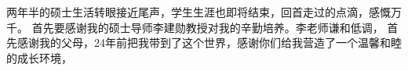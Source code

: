 \begin{thanks}
两年半的硕士生活转眼接近尾声，学生生涯也即将结束，回首走过的点滴，感慨万千。
首先要感谢我的硕士导师李建勋教授对我的辛勤培养。李老师谦和低调，
首先感谢我的父母，24年前把我带到了这个世界，感谢你们给我营造了一个温馨和睦的成长环境，


\end{thanks}
